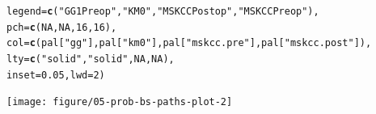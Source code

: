 \documentclass{article}\usepackage[]{graphicx}\usepackage[]{color}
\makeatletter
\newcommand{\hlnum}[1]{\textcolor[rgb]{0.686,0.059,0.569}{#1}}%
\newcommand{\hlstr}[1]{\textcolor[rgb]{0.192,0.494,0.8}{#1}}%
\newcommand{\hlstd}[1]{\textcolor[rgb]{0.345,0.345,0.345}{#1}}%
\newcommand{\hlkwc}[1]{\textcolor[rgb]{0.333,0.667,0.333}{#1}}%
\newcommand{\hlkwd}[1]{\textcolor[rgb]{0.737,0.353,0.396}{\textbf{#1}}}%
\newenvironment{kframe}{%
 \def\at@end@of@kframe{}%
 \ifinner\ifhmode%
  \def\at@end@of@kframe{\end{minipage}}%
  \begin{minipage}{\columnwidth}%
 \fi\fi%
 \def\FrameCommand##1{\hskip\@totalleftmargin \hskip-\fboxsep
 \colorbox{shadecolor}{##1}\hskip-\fboxsep
     \hskip-\linewidth \hskip-\@totalleftmargin \hskip\columnwidth}%
 \MakeFramed {\advance\hsize-\width
   \@totalleftmargin\z@ \linewidth\hsize
   \@setminipage}}%
 {\par\unskip\endMakeFramed%
 \at@end@of@kframe}
\newenvironment{knitrout}{}{} %
\makeatother
\begin{document}
\begin{knitrout}
\begin{kframe}
\begin{alltt}
        \hlkwc{legend} \hlstd{=} \hlkwd{c}\hlstd{(}     \hlstr{"GG1 Preop"}\hlstd{,}    \hlstr{"KM0"}\hlstd{,}          \hlstr{"MSKCC Postop"}\hlstd{,}         \hlstr{"MSKCC Preop"}\hlstd{),}
        \hlkwc{pch} \hlstd{=} \hlkwd{c}\hlstd{(}        \hlnum{NA}\hlstd{,}                     \hlnum{NA}\hlstd{,}             \hlnum{16}\hlstd{,}                             \hlnum{16}\hlstd{),}
        \hlkwc{col} \hlstd{=} \hlkwd{c}\hlstd{(        pal[}\hlstr{"gg"}\hlstd{],              pal[}\hlstr{"km0"}\hlstd{], pal[}\hlstr{"mskcc.pre"}\hlstd{],   pal[}\hlstr{"mskcc.post"}\hlstd{]),}
        \hlkwc{lty} \hlstd{=} \hlkwd{c}\hlstd{(}        \hlstr{"solid"}\hlstd{,}                \hlstr{"solid"}\hlstd{,}        \hlnum{NA}\hlstd{,}                             \hlnum{NA}\hlstd{),}
        \hlkwc{inset} \hlstd{=} \hlnum{0.05}\hlstd{,} \hlkwc{lwd} \hlstd{=} \hlnum{2}\hlstd{)}
\end{alltt}
\end{kframe}

{\centering \texttt{[image: figure/05-prob-bs-paths-plot-2]} 

}



\end{knitrout}
\end{document}
